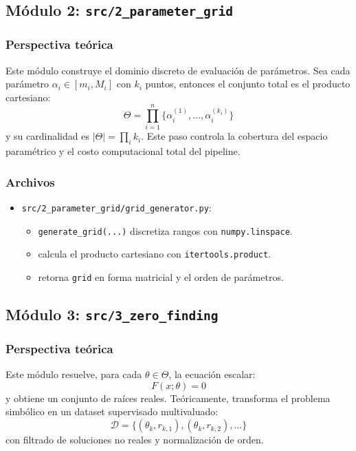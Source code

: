 \documentclass[12pt]{article}
\begin{document}
\subsection{Módulo 2: \texttt{src/2\_parameter\_grid}}
\subsubsection*{Perspectiva teórica}
Este módulo construye el dominio discreto de evaluación de parámetros. Sea cada parámetro
\(
\alpha_i \in [m_i, M_i]
\)
con $k_i$ puntos, entonces el conjunto total es el producto cartesiano:
\[
\Theta = \prod_{i=1}^{n} \{\alpha_i^{(1)},\ldots,\alpha_i^{(k_i)}\}
\]
y su cardinalidad es $|\Theta| = \prod_i k_i$. Este paso controla la cobertura del espacio paramétrico y el costo computacional total del pipeline.

\subsubsection*{Archivos}
\begin{itemize}[leftmargin=1.5em]
    \item \texttt{src/2\_parameter\_grid/grid\_generator.py}:
    \begin{itemize}[leftmargin=1.5em]
        \item \texttt{generate\_grid(...)} discretiza rangos con \texttt{numpy.linspace}.
        \item calcula el producto cartesiano con \texttt{itertools.product}.
        \item retorna \texttt{grid} en forma matricial y el orden de parámetros.
    \end{itemize}
\end{itemize}

\subsection{Módulo 3: \texttt{src/3\_zero\_finding}}
\subsubsection*{Perspectiva teórica}
Este módulo resuelve, para cada $\theta \in \Theta$, la ecuación escalar:
\[
F(x;\theta)=0
\]
y obtiene un conjunto de raíces reales. Teóricamente, transforma el problema simbólico en un dataset supervisado multivaluado:
\[
\mathcal{D}=\{(\theta_k, r_{k,1}), (\theta_k, r_{k,2}), \ldots\}
\]
con filtrado de soluciones no reales y normalización de orden.
\end{document}
